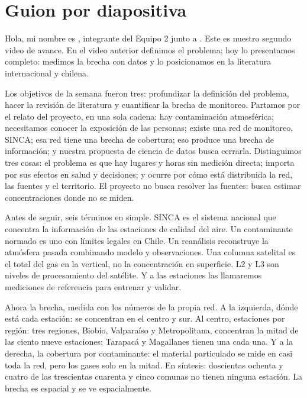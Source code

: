 \section{Guion por diapositiva}

 Hola, mi nombre es , integrante del Equipo 2 junto a . Este es nuestro segundo video de avance. En el video anterior definimos el problema; hoy lo presentamos completo: medimos la brecha con datos y lo posicionamos en la literatura internacional y chilena.

 Los objetivos de la semana fueron tres: profundizar la definición del problema, hacer la revisión de literatura y cuantificar la brecha de monitoreo. Partamos por el relato del proyecto, en una sola cadena: hay contaminación atmosférica; necesitamos conocer la exposición de las personas; existe una red de monitoreo, SINCA; esa red tiene una brecha de cobertura; eso produce una brecha de información; y nuestra propuesta de ciencia de datos busca cerrarla. Distinguimos tres cosas: el problema es que hay lugares y horas sin medición directa; importa por sus efectos en salud y decisiones; y ocurre por cómo está distribuida la red, las fuentes y el territorio. El proyecto no busca resolver las fuentes: busca estimar concentraciones donde no se miden.

Antes de seguir, seis términos en simple. SINCA es el sistema nacional que concentra la información de las estaciones de calidad del aire. Un contaminante normado es uno con límites legales en Chile. Un reanálisis reconstruye la atmósfera pasada combinando modelo y observaciones. Una columna satelital es el total del gas en la vertical, no la concentración en superficie. L2 y L3 son niveles de procesamiento del satélite. Y a las estaciones las llamaremos mediciones de referencia para entrenar y validar.

 Ahora la brecha, medida con los números de la propia red.  A la izquierda, dónde está cada estación: se concentran en el centro y sur.  Al centro, estaciones por región: tres regiones, Biobío, Valparaíso y Metropolitana, concentran la mitad de las ciento nueve estaciones; Tarapacá y Magallanes tienen una cada una.  Y a la derecha, la cobertura por contaminante: el material particulado se mide en casi toda la red, pero los gases solo en la mitad. En síntesis: doscientas ochenta y cuatro de las trescientas cuarenta y cinco comunas no tienen ninguna estación. La brecha es espacial y se ve espacialmente.

